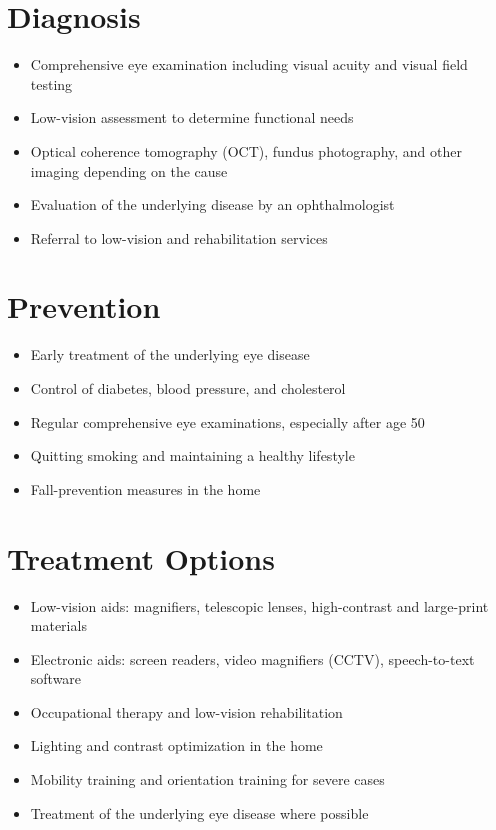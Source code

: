 \section{Diagnosis}
\begin{itemize}[noitemsep]
  \item Comprehensive eye examination including visual acuity and visual field testing
  \item Low-vision assessment to determine functional needs
  \item Optical coherence tomography (OCT), fundus photography, and other imaging depending on the cause
  \item Evaluation of the underlying disease by an ophthalmologist
  \item Referral to low-vision and rehabilitation services
\end{itemize}
\section{Prevention}
\begin{itemize}[noitemsep]
  \item Early treatment of the underlying eye disease
  \item Control of diabetes, blood pressure, and cholesterol
  \item Regular comprehensive eye examinations, especially after age 50
  \item Quitting smoking and maintaining a healthy lifestyle
  \item Fall-prevention measures in the home
\end{itemize}
\section{Treatment Options}
\begin{itemize}[noitemsep]
  \item Low-vision aids: magnifiers, telescopic lenses, high-contrast and large-print materials
  \item Electronic aids: screen readers, video magnifiers (CCTV), speech-to-text software
  \item Occupational therapy and low-vision rehabilitation
  \item Lighting and contrast optimization in the home
  \item Mobility training and orientation training for severe cases
  \item Treatment of the underlying eye disease where possible
\end{itemize}

